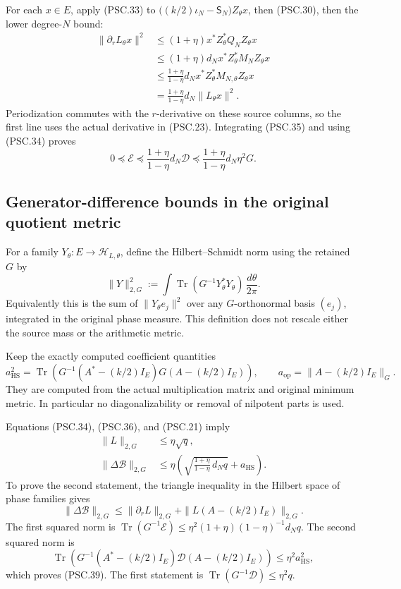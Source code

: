 For each \(x\in E\), apply (PSC.33) to
\(\bigl((k/2)\iota_N-\mathsf S_N\bigr)Z_\theta x\), then (PSC.30), then the lower degree-\(N\) bound:
\[
 \begin{aligned}
 \|\partial_rL_\theta x\|^2
 &\leq(1+\eta)x^*Z_\theta^*Q_NZ_\theta x\\
 &\leq(1+\eta)d_Nx^*Z_\theta^*M_NZ_\theta x\\
 &\leq\frac{1+\eta}{1-\eta}d_N
          x^*Z_\theta^*M_{N,\theta}Z_\theta x\\
 &=\frac{1+\eta}{1-\eta}d_N\|L_\theta x\|^2.
 \end{aligned}
 \tag{PSC.35}
\]
Periodization commutes with the \(r\)-derivative on these source columns, so the first line uses the actual derivative in (PSC.23). Integrating (PSC.35) and using (PSC.34) proves
\[
 0\preceq\mathscr E
 \preceq\frac{1+\eta}{1-\eta}d_N\mathscr D
 \preceq\frac{1+\eta}{1-\eta}d_N\eta^2G.
 \tag{PSC.36}
\]

\subsection{Generator-difference bounds in the original quotient metric}

For a family \(Y_\theta:E\to\mathcal H_{L,\theta}\), define the Hilbert–Schmidt norm using the retained \(G\) by
\[
 \|Y\|_{2,G}^2
 :=\int\operatorname{Tr}(G^{-1}Y_\theta^*Y_\theta)
                  \,\frac{d\theta}{2\pi}.
 \tag{PSC.37}
\]
Equivalently this is the sum of \(\|Y_\theta e_j\|^2\) over any \(G\)-orthonormal basis \((e_j)\), integrated in the original phase measure. This definition does not rescale either the source mass or the arithmetic metric.

Keep the exactly computed coefficient quantities
\[
 a_{\mathrm{HS}}^2
 =\operatorname{Tr}\!\left(
       G^{-1}(A^*-(k/2)I_E)G(A-(k/2)I_E)\right),\qquad
 a_{\mathrm{op}}=\|A-(k/2)I_E\|_G.
 \tag{PSC.38}
\]
They are computed from the actual multiplication matrix and original minimum metric. In particular no diagonalizability or removal of nilpotent parts is used.

Equations (PSC.34), (PSC.36), and (PSC.21) imply
\[
 \boxed{
 \begin{aligned}
 \|L\|_{2,G}&\leq\eta\sqrt q,\\
 \|\Delta\mathscr B\|_{2,G}
 &\leq\eta\left(
     \sqrt{\frac{1+\eta}{1-\eta}\,d_Nq}
     +a_{\mathrm{HS}}\right).
 \end{aligned}}
 \tag{PSC.39}
\]
To prove the second statement, the triangle inequality in the Hilbert space of phase families gives
\[
 \|\Delta\mathscr B\|_{2,G}
 \leq\|\partial_rL\|_{2,G}
      +\|L(A-(k/2)I_E)\|_{2,G}.
 \]
The first squared norm is
\(\operatorname{Tr}(G^{-1}\mathscr E)
\leq\eta^2(1+\eta)(1-\eta)^{-1}d_Nq\).
The second squared norm is
\[
 \operatorname{Tr}\!\left(
 G^{-1}(A^*-(k/2)I_E)\mathscr D(A-(k/2)I_E)\right)
 \leq\eta^2a_{\mathrm{HS}}^2,
 \]
which proves (PSC.39). The first statement is
\(\operatorname{Tr}(G^{-1}\mathscr D)\leq\eta^2q\).

